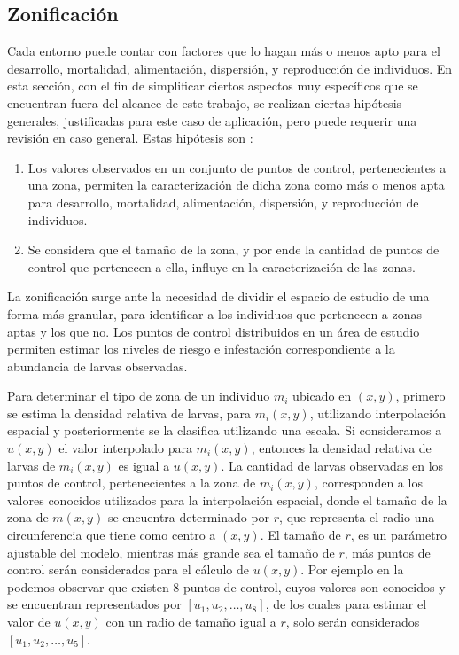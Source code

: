 \subsection{Zonificación}
\label{subsec:cap4-zonificacion}
Cada entorno puede contar con factores que lo hagan más o menos apto para el desarrollo,
mortalidad, alimentación, dispersión, y reproducción de individuos. En esta sección, con el fin de
simplificar ciertos aspectos muy específicos que se encuentran fuera del alcance de este trabajo,
se realizan ciertas hipótesis generales, justificadas para este caso de aplicación, pero puede
requerir una revisión en caso general. Estas hipótesis son :
\begin{enumerate}
    \item Los valores observados en un conjunto de puntos de control, pertenecientes a una zona, permiten la caracterización de dicha zona como más o menos apta para desarrollo, mortalidad, alimentación, dispersión, y reproducción de individuos.
    \item Se considera que el tamaño de la zona, y por ende la cantidad de puntos de control que pertenecen a ella, influye en la caracterización de las zonas.
\end{enumerate}

La zonificación surge ante la necesidad de dividir el espacio de estudio de una forma más granular,
para identificar a los individuos que pertenecen a zonas aptas y los que no. Los puntos de control
distribuidos en un área de estudio permiten estimar los niveles de riesgo e infestación
correspondiente a la abundancia de larvas observadas.

Para determinar el tipo de zona de un individuo $m_{i}$ ubicado en $(x,y)$, primero se estima la
densidad relativa de larvas, para $m_{i}(x,y)$, utilizando interpolación espacial y posteriormente
se la clasifica utilizando una escala. Si consideramos a $u(x,y)$ el valor interpolado para
$m_{i}(x,y)$, entonces la densidad relativa de larvas de $m_{i}(x,y)$ es igual a $u(x,y)$. La
cantidad de larvas observadas en los puntos de control, pertenecientes a la zona de $m_{i}(x,y)$,
corresponden a los valores conocidos utilizados para la interpolación espacial, donde el tamaño de
la zona de $m(x,y)$ se encuentra determinado por $r$, que representa el radio una circunferencia
que tiene como centro a $(x,y)$. El tamaño de $r$, es un parámetro ajustable del modelo, mientras
más grande sea el tamaño de $r$, más puntos de control serán considerados para el cálculo de
$u(x,y)$. Por ejemplo en la  podemos observar que existen 8 puntos
de control, cuyos valores son conocidos y se encuentran representados por
$[u_{1}, u_{2}, \dots ,u_{8}]$, de los cuales para estimar el valor de $u(x,y)$ con un radio de
tamaño igual a $r$, solo serán considerados $[u_{1}, u_{2},\dots,u_{5}]$.

